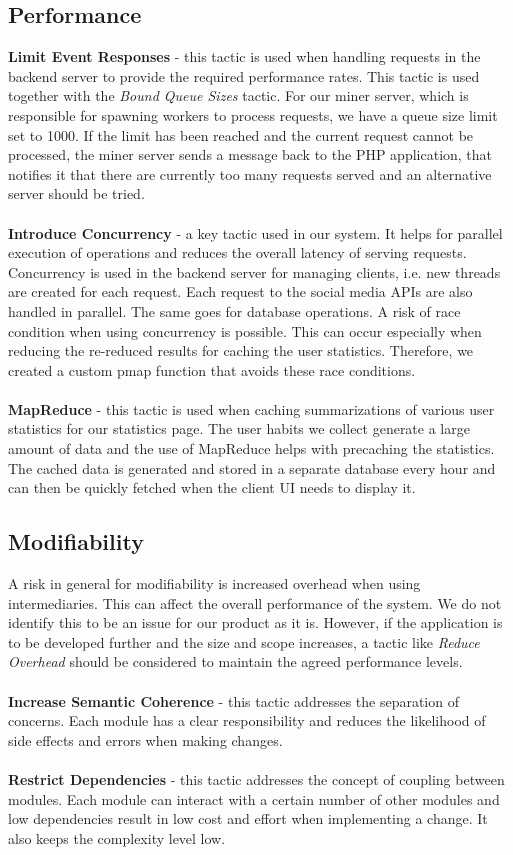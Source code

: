 \subsection{Performance}
\textbf{Limit Event Responses} - this tactic is used when handling requests in
the backend server to provide the required performance rates. This tactic is
used together with the \textit{Bound Queue Sizes} tactic. For our miner server,
which is responsible for spawning workers to process requests, we have a queue
size limit set to 1000. If the limit has been reached and the current request
cannot be processed, the miner server sends a message back to the PHP
application, that notifies it that there are currently too many requests served
and an alternative server should be tried. \\ \\
\textbf{Introduce Concurrency} - a key tactic used in our system. It helps for
parallel execution of operations and reduces the overall latency of serving
requests. Concurrency is used in the backend server for managing clients, i.e.
new threads are created for each request. Each request to the social media APIs
are also handled in parallel. The same goes for database operations. \newline
A risk of race condition when using concurrency is possible. This can occur
especially when reducing the re-reduced results for caching the user statistics.
Therefore, we created a custom pmap function that avoids these race conditions.
\\ \\
\textbf{MapReduce} - this tactic is used when caching summarizations of various
user statistics for our statistics page. The user habits we collect generate a
large amount of data and the use of MapReduce helps with precaching the
statistics. The cached data is generated and stored in a separate database every
hour and can then be quickly fetched when the client UI needs to display it.

\subsection{Modifiability}
A risk in general for modifiability is increased overhead when using
intermediaries. This can affect the overall performance of the system. We do not
identify this to be an issue for our product as it is. However, if the
application is to be developed further and the size and scope increases, a
tactic like \textit{Reduce Overhead} should be considered to maintain the agreed
performance levels. \\ \\
\textbf{Increase Semantic Coherence} - this tactic addresses the separation of
concerns. Each module has a clear responsibility and reduces the likelihood of
side effects and errors when making changes. \\ \\
\textbf{Restrict Dependencies} - this tactic addresses the concept of coupling
between modules. Each module can interact with a certain number of other modules
and low dependencies result in low cost and effort when implementing a change.
It also keeps the complexity level low.

